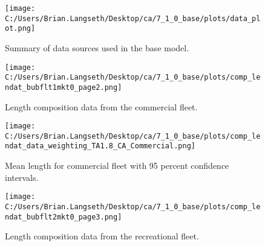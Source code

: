 \documentclass[11pt,
  english,
  a4paper,
]{article}
\begin{document}

\begin{figure}
\centering
\texttt{[image: C:/Users/Brian.Langseth/Desktop/ca/7\_1\_0\_base/plots/data\_plot.png]}
\caption{Summary of data sources used in the base model.\label{fig:data-plot}}
\end{figure}

\tagmcend\tagstructend


\begin{figure}
\centering
\texttt{[image: C:/Users/Brian.Langseth/Desktop/ca/7\_1\_0\_base/plots/comp\_lendat\_bubflt1mkt0\_page2.png]}
\caption{Length composition data from the commercial fleet.\label{fig:com-len-data}}
\end{figure}

\tagmcend\tagstructend


\begin{figure}
\centering
\texttt{[image: C:/Users/Brian.Langseth/Desktop/ca/7\_1\_0\_base/plots/comp\_lendat\_data\_weighting\_TA1.8\_CA\_Commercial.png]}
\caption{Mean length for commercial fleet with 95 percent confidence intervals.\label{fig:mean-com-len-data}}
\end{figure}

\tagmcend\tagstructend


\begin{figure}
\centering
\texttt{[image: C:/Users/Brian.Langseth/Desktop/ca/7\_1\_0\_base/plots/comp\_lendat\_bubflt2mkt0\_page3.png]}
\caption{Length composition data from the recreational fleet.\label{fig:rec-len-data}}
\end{figure}

\tagmcend\tagstructend

\end{document}
